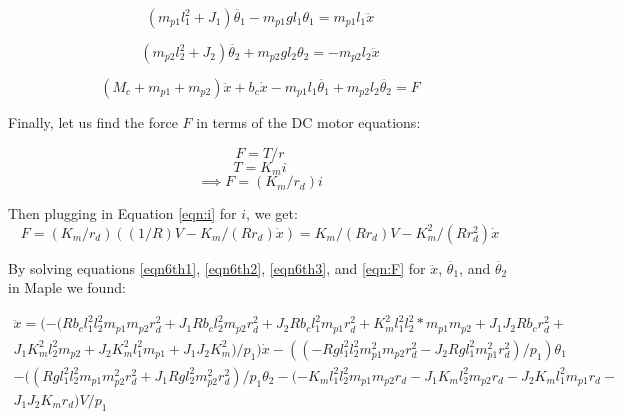 \documentclass{article}
\begin{document}
\begin{equation} 
\label{eqn6th1}
(m_{p1} l_1^2+J_1) \ddot{\theta_1}-m_{p1} g l_1 \theta_1 = m_{p1} l_1 \ddot{x}
\end{equation}

\begin{equation} 
\label{eqn6th2}
(m_{p2} l_2^2+J_2) \ddot{\theta_2}+m_{p2} g l_2 \theta_2 = -m_{p2} l_2 \ddot{x}
\end{equation}

\begin{equation} 
\label{eqn6th3}
(M_c+m_{p1}+m_{p2}) \ddot{x}+b_c \dot{x}-m_{p1} l_1 \ddot{\theta_1}+m_{p2} l_2 \ddot{\theta_2} = F
\end{equation}

Finally, let us find the force $F$ in terms of the DC motor equations:

\begin{equation*}
F = T / r
\end{equation*}
\begin{equation*}
T = K_m i
\end{equation*}
\begin{equation*}
\implies F = (K_m / r_d) i
\end{equation*}

Then plugging in Equation \ref{eqn:i} for $i$, we get:
\begin{equation}
F = (K_m/r_d)((1/R)V - K_m/(R r_d) \dot{x}) = K_m/(R r_d) V - K_m^2 / (R r_d^2) \dot{x}
\label{eqn:F}
\end{equation}

By solving equations \ref{eqn6th1}, \ref{eqn6th2}, \ref{eqn6th3}, and \ref{eqn:F} for $\ddot{x}$, $\ddot{\theta_1}$, and $\ddot{\theta_2}$ in Maple we found:

\begin{multline} 
\label{eqn6th4}
\ddot{x} = (-(R b_c l_1^2 l_2^2 m_{p1} m_{p2} r_d^2+J_1 R b_c l_2^2 m_{p2} r_d^2+J_2 R b_c l_1^2 m_{p1} r_d^2+K_m^2 l_1^2 l_2^2*m_{p1} m_{p2}+J_1 J_2 R b_c r_d^2+\\J_1 K_m^2 l_2^2 m_{p2}+J_2 K_m^2 l_1^2 m_{p1}+J_1 J_2 K_m^2)/p_1)\dot{x} -((-R g l_1^2 l_2^2 m_{p1}^2 m_{p2} r_d^2-J_2 R g l_1^2 m_{p1}^2 r_d^2)/p_1)\theta_1 \\-((R g l_1^2 l_2^2 m_{p1} m_{p2}^2 r_d^2+J_1 R g l_2^2 m_{p2}^2 r_d^2)/p_1 \theta_2 -(-K_m l_1^2 l_2^2 m_{p1} m_{p2} r_d-J_1 K_m l_2^2 m_{p2} r_d-J_2 K_m l_1^2 m_{p1} r_d-\\J_1 J_2 K_m r_d) V/p_1
\end{multline}
\end{document}
